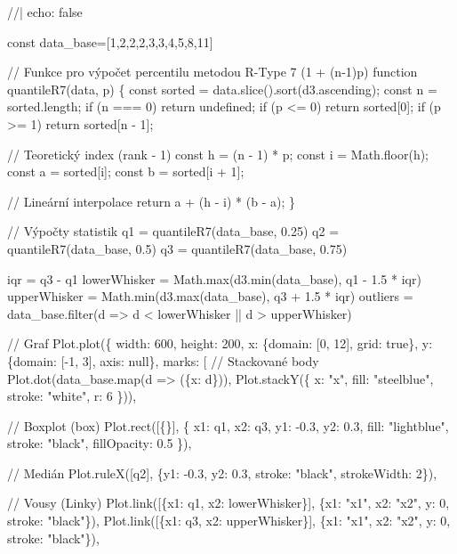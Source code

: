 \documentclass[
  czech,
  11pt,
  letterpaper,
  DIV=11,
  numbers=noendperiod]{scrreprt}
\newenvironment{Shaded}{\begin{snugshade}}{\end{snugshade}}
\newcommand{\NormalTok}[1]{\textcolor[rgb]{0.00,0.23,0.31}{#1}}
\begin{document}
\begin{Shaded}
\begin{Highlighting}[]
\NormalTok{//| echo: false}

\NormalTok{const data\_base=[1,2,2,2,3,3,4,5,8,11]}

\NormalTok{// Funkce pro výpočet percentilu metodou R{-}Type 7 (1 + (n{-}1)p)}
\NormalTok{function quantileR7(data, p) \{}
\NormalTok{  const sorted = data.slice().sort(d3.ascending);}
\NormalTok{  const n = sorted.length;}
\NormalTok{  if (n === 0) return undefined;}
\NormalTok{  if (p \textless{}= 0) return sorted[0];}
\NormalTok{  if (p \textgreater{}= 1) return sorted[n {-} 1];}

\NormalTok{  // Teoretický index (rank {-} 1)}
\NormalTok{  const h = (n {-} 1) * p;}
\NormalTok{  const i = Math.floor(h);}
\NormalTok{  const a = sorted[i];}
\NormalTok{  const b = sorted[i + 1];}

\NormalTok{  // Lineární interpolace}
\NormalTok{  return a + (h {-} i) * (b {-} a);}
\NormalTok{\}}

\NormalTok{// Výpočty statistik}
\NormalTok{q1 = quantileR7(data\_base, 0.25)}
\NormalTok{q2 = quantileR7(data\_base, 0.5)}
\NormalTok{q3 = quantileR7(data\_base, 0.75)}

\NormalTok{iqr = q3 {-} q1}
\NormalTok{lowerWhisker = Math.max(d3.min(data\_base), q1 {-} 1.5 * iqr)}
\NormalTok{upperWhisker = Math.min(d3.max(data\_base), q3 + 1.5 * iqr)}
\NormalTok{outliers = data\_base.filter(d =\textgreater{} d \textless{} lowerWhisker || d \textgreater{} upperWhisker)}

\NormalTok{// Graf}
\NormalTok{Plot.plot(\{}
\NormalTok{  width: 600,}
\NormalTok{  height: 200,}
\NormalTok{  x: \{domain: [0, 12], grid: true\},}
\NormalTok{  y: \{domain: [{-}1, 3], axis: null\},}
\NormalTok{  marks: [}
\NormalTok{    // Stackované body}
\NormalTok{    Plot.dot(data\_base.map(d =\textgreater{} (\{x: d\})), Plot.stackY(\{}
\NormalTok{      x: "x",}
\NormalTok{      fill: "steelblue",}
\NormalTok{      stroke: "white",}
\NormalTok{      r: 6}
\NormalTok{    \})),}
    
\NormalTok{    // Boxplot (box)}
\NormalTok{    Plot.rect([\{\}], \{}
\NormalTok{      x1: q1, x2: q3, y1: {-}0.3, y2: 0.3,}
\NormalTok{      fill: "lightblue", stroke: "black", fillOpacity: 0.5}
\NormalTok{    \}),}
    
\NormalTok{    // Medián}
\NormalTok{    Plot.ruleX([q2], \{y1: {-}0.3, y2: 0.3, stroke: "black", strokeWidth: 2\}),}
    
\NormalTok{    // Vousy (Linky)}
\NormalTok{    Plot.link([\{x1: q1, x2: lowerWhisker\}], \{x1: "x1", x2: "x2", y: 0, stroke: "black"\}),}
\NormalTok{    Plot.link([\{x1: q3, x2: upperWhisker\}], \{x1: "x1", x2: "x2", y: 0, stroke: "black"\}),}
    

\end{Highlighting}
\end{Shaded}
\end{document}
